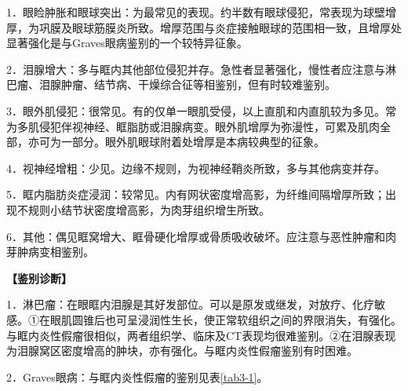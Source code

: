 1．眼睑肿胀和眼球突出：为最常见的表现。约半数有眼球侵犯，常表现为球壁增厚，为巩膜及眼球筋膜炎所致。增厚范围与炎症接触眼球的范围相一致，且增厚处显著强化是与Graves眼病鉴别的一个较特异征象。

2．泪腺增大：多与眶内其他部位侵犯并存。急性者显著强化，慢性者应注意与淋巴瘤、泪腺肿瘤、结节病、干燥综合征等相鉴别，但有时较难鉴别。

3．眼外肌侵犯：很常见。有的仅单一眼肌受侵，以上直肌和内直肌较为多见。常为多肌侵犯伴视神经、眶脂肪或泪腺病变。眼外肌增厚为弥漫性，可累及肌肉全部，亦可为一部分。眼外肌眼球附着处增厚是本病较典型的征象。

4．视神经增粗：少见。边缘不规则，为视神经鞘炎所致，多与其他病变并存。

5．眶内脂肪炎症浸润：较常见。内有网状密度增高影，为纤维间隔增厚所致；出现不规则小结节状密度增高影，为肉芽组织增生所致。

6．其他：偶见眶窝增大、眶骨硬化增厚或骨质吸收破坏。应注意与恶性肿瘤和肉芽肿病变相鉴别。

\textbf{【鉴别诊断】}

1．淋巴瘤：在眼眶内泪腺是其好发部位。可以是原发或继发，对放疗、化疗敏感。①在眼肌圆锥后也可呈浸润性生长，使正常软组织之间的界限消失，有强化。与眶内炎性假瘤很相似，两者组织学、临床及CT表现均很难鉴别。②在泪腺表现为泪腺窝区密度增高的肿块，亦有强化。与眶内炎性假瘤鉴别有时困难。

2．Graves眼病：与眶内炎性假瘤的鉴别见表\ref{tab3-1}。

